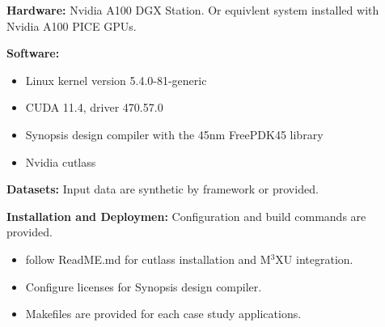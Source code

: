 \documentclass[conference]{IEEEtran}
\newcommand{\MPCMXU}[1]{M$^{3}$XU}
\begin{document}
\artin
\noindent\textbf{Hardware:} Nvidia A100 DGX Station. Or equivlent system installed with Nvidia A100 PICE GPUs.

\noindent\textbf{Software:}
\begin{itemize}
    \item Linux kernel version 5.4.0-81-generic
    \item CUDA 11.4, driver 470.57.0
    \item Synopsis design compiler with the 45nm FreePDK45 library
    \item Nvidia cutlass
\end{itemize}

\noindent\textbf{Datasets:} Input data are synthetic by framework or provided. 

\noindent\textbf{Installation and Deploymen:} Configuration and build commands are provided.



\artcomp
\begin{itemize}
    \item follow ReadME.md for cutlass installation and \MPCMXU{} integration.
    \item Configure licenses for Synopsis design compiler.
    \item Makefiles are provided for each case study applications.
\end{itemize}
\end{document}
